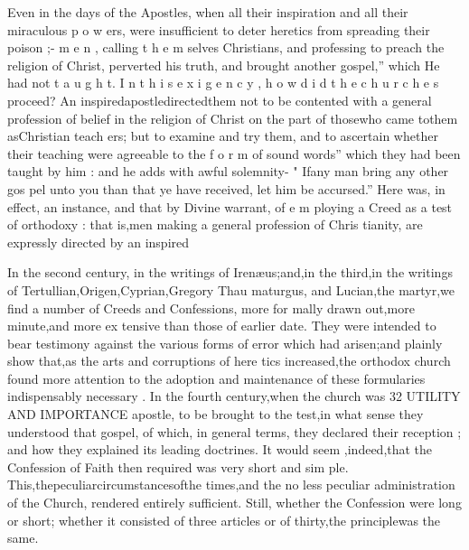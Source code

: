 \documentclass[
]{book}
\begin{document}
Even in the days of the Apostles, when all
their inspiration and all their miraculous p o w ers, were insufficient to deter heretics from
spreading their poison ;- m e n , calling t h e m selves Christians, and professing to preach the
religion of Christ, perverted his truth, and brought another gospel,'' which He had not t a u g h t. I n t h i s e x i g e n c y , h o w d i d t h e c h u r c h e s proceed? An inspiredapostledirectedthem not to be contented with a general profession of belief in the religion of Christ on the part of thosewho came tothem asChristian teach ers; but to examine and try them, and to ascertain whether their teaching were agreeable to the f o r m of sound words'' which they had
been taught by him : and he adds with awful solemnity- " Ifany man bring any other gos pel unto you than that ye have received, let him be accursed.'' Here was, in effect, an
instance, and that by Divine warrant, of e m
ploying a Creed as a test of orthodoxy : that is,men making a general profession of Chris
tianity, are expressly directed by an inspired

In the second century, in the writings of Irenæus;and,in the third,in the writings of Tertullian,Origen,Cyprian,Gregory Thau maturgus, and Lucian,the martyr,we find a number of Creeds and Confessions, more for mally drawn out,more minute,and more ex tensive than those of earlier date. They were intended to bear testimony against the various forms of error which had arisen;and plainly show that,as the arts and corruptions of here tics increased,the orthodox church found more attention to the adoption and maintenance of these formularies indispensably necessary .
In the fourth century,when the church was
32 UTILITY AND IMPORTANCE
apostle, to be brought to the test,in what sense they understood that gospel, of which, in
general terms, they declared their reception ;
and how they explained its leading doctrines. It would seem ,indeed,that the Confession of
Faith then required was very short and sim
ple. This,thepeculiarcircumstancesofthe
times,and the no less peculiar administration
of the Church, rendered entirely sufficient.
Still, whether the Confession were long or short; whether it consisted of three articles or
of thirty,the principlewas the same.
\end{document}
